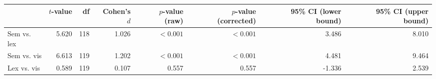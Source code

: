 \begin{tabular}{lrrrrrrr}
\toprule
 & $t$-value & df & Cohen's $d$ & $p$-value (raw) & $p$-value (corrected) & 95\% CI (lower bound) & 95\% CI (upper bound) \\
\midrule
\rowcolor[HTML]{fffee3} Sem vs. lex & 5.620 & 118 & 1.026 & $< 0.001$ & $< 0.001$ & 3.486 & 8.010 \\
\rowcolor[HTML]{fffee3} Sem vs. vis & 6.613 & 119 & 1.202 & $< 0.001$ & $< 0.001$ & 4.481 & 9.464 \\
 Lex vs. vis & 0.589 & 119 & 0.107 & 0.557 & 0.557 & -1.336 & 2.539 \\
\bottomrule
\end{tabular}